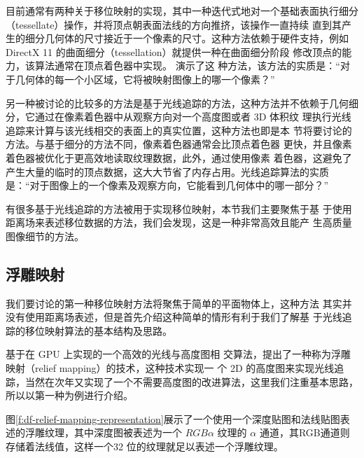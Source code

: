 目前通常有两种关于移位映射的实现，其中一种迭代式地对一个基础表面执行细分（tessellate）操作，并将顶点朝表面法线的方向推挤，该操作一直持续 直到其产生的细分几何体的尺寸接近于一个像素的尺寸。这种方法依赖于硬件支持，例如DirectX 11 的曲面细分（tessellation）就提供一种在曲面细分阶段 修改顶点的能力，该算法通常在顶点着色器中实现。\cite{a:AdaptiveTessellationofSubdivisionSurfaceswithDisplacementMapping} 演示了这 种方法，该方法的实质是：“对于几何体的每一个小区域，它将被映射图像上的哪一个像素？” 

另一种被讨论的比较多的方法是基于光线追踪的方法，这种方法并不依赖于几何细分，它通过在像素着色器中从观察方向对一个高度图或者 3D 体积纹 理执行光线追踪来计算与该光线相交的表面上的真实位置，这种方法也即是本 节将要讨论的方法。与基于细分的方法不同，像素着色器通常会比顶点着色器 更快，并且像素着色器被优化于更高效地读取纹理数据，此外，通过使用像素 着色器，这避免了产生大量的临时的顶点数据，这大大节省了内存占用。光线追踪算法的实质是：“对于图像上的一个像素及观察方向，它能看到几何体中的哪一部分？”

有很多基于光线追踪的方法被用于实现移位映射，本节我们主要聚焦于基 于使用距离场来表述移位数据的方法，我们会发现，这是一种非常高效且能产 生高质量图像细节的方法。



\subsection{浮雕映射}
我们要讨论的第一种移位映射方法将聚焦于简单的平面物体上，这种方法 其实并没有使用距离场表述，但是首先介绍这种简单的情形有利于我们了解基 于光线追踪的移位映射算法的基本结构及思路。

\cite{a:Real-TimeReliefMappingonArbitraryPolygonalSurfaces}基于在 GPU 上实现的一个高效的光线与高度图相 交算法，提出了一种称为浮雕映射（relief mapping）的技术，这种技术实现一 个 2D 的高度图来实现光线追踪，当然在次年\cite{a:ReliefMappingofNo-Height-FieldSurfaceDetails}又实现了一个不需要高度图的改进算法，这里我们注重基本思路，所以以第一种为例进行介绍。

图\ref{f:df-relief-mapping-representation}展示了一个使用一个深度贴图和法线贴图表述的浮雕纹理，其中深度图被表述为一个 $RGB\alpha$ 纹理的 $\alpha$ 通道，其RGB通道则存储着法线值，这样一个32 位的纹理就足以表述一个浮雕纹理。


